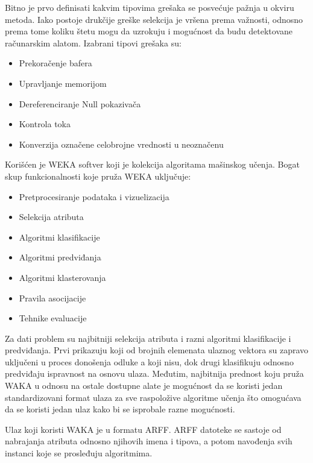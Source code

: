 \documentclass[a4paper]{article}
\theoremstyle{definition}
\begin{document}
{Bitno je prvo definisati kakvim tipovima grešaka se posvećuje pažnja u okviru metoda.
Iako postoje drukčije greške selekcija je vršena prema važnosti, odnosno prema tome
koliku štetu mogu da uzrokuju i mogućnost da budu detektovane računarskim alatom. Izabrani tipovi grešaka su:

\begin{itemize}
\item Prekoračenje bafera

\item Upravljanje memorijom

\item Dereferenciranje Null pokazivača

\item Kontrola toka

\item Konverzija označene celobrojne vrednosti u neoznačenu
\end{itemize}


Korišćen je WEKA softver koji je kolekcija algoritama mašinskog učenja.
Bogat skup funkcionalnosti koje pruža WEKA uključuje:
\begin{itemize}
\item Pretprocesiranje podataka i vizuelizacija
\item Selekcija atributa
\item Algoritmi klasifikacije
\item Algoritmi predviđanja
\item Algoritmi klasterovanja
\item Pravila asocijacije
\item Tehnike evaluacije
\end{itemize}


Za dati problem su najbitniji selekcija atributa i razni algoritmi klasifikacije i predviđanja.
Prvi prikazuju koji od brojnih elemenata ulaznog vektora su zapravo uključeni u proces donošenja odluke a koji nisu, dok
drugi klasifikuju odnosno predviđaju ispravnost na osnovu ulaza.
Međutim, najbitnija prednost koju pruža WAKA u odnosu na ostale dostupne alate je mogućnost da se koristi
jedan standardizovani format ulaza za sve raspoložive algoritme učenja što omogućava da se koristi jedan ulaz kako bi se isprobale
razne mogućnosti.

Ulaz koji koristi WAKA je u formatu ARFF.
ARFF datoteke se sastoje od nabrajanja atributa odnosno njihovih imena i tipova, a potom navođenja svih instanci koje se prosleđuju algoritmima.

}
\end{document}
